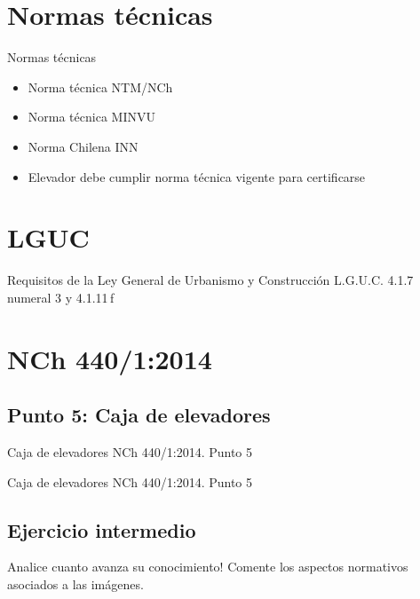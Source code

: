 \section{Normas técnicas}
\begin{frame}{Normas técnicas}
	\begin{itemize}
		\item Norma técnica NTM/NCh
		\item Norma técnica MINVU
		\item Norma Chilena INN
		\item Elevador debe cumplir norma técnica vigente para certificarse
	\end{itemize}
\end{frame}

\section{LGUC}
\begin{frame}{Requisitos de la Ley General de Urbanismo y Construcción}
	L.G.U.C. 4.1.7 numeral 3 y 4.1.11\,f
\end{frame}

\section{NCh 440/1:2014}
\subsection{Punto 5: Caja de elevadores}
\begin{frame}{Caja de elevadores NCh 440/1:2014. Punto 5}
\end{frame}

\begin{frame}{Caja de elevadores NCh 440/1:2014. Punto 5}
\end{frame}

\subsection{Ejercicio intermedio}
\begin{frame}{Analice cuanto avanza su conocimiento!}
	Comente los aspectos normativos asociados a las imágenes.
	
	\begin{center}
	\end{center}
\end{frame}

